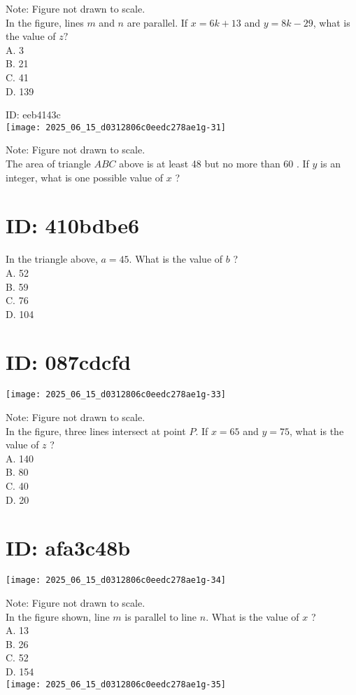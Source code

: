 Note: Figure not drawn to scale.\\
In the figure, lines $m$ and $n$ are parallel. If $x=6 k+13$ and $y=8 k-29$, what is the value of $z ?$\\
A. 3\\
B. 21\\
C. 41\\
D. 139

ID: eeb4143c\\
\texttt{[image: 2025\_06\_15\_d0312806c0eedc278ae1g-31]}

Note: Figure not drawn to scale.\\
The area of triangle $A B C$ above is at least 48 but no more than 60 . If $y$ is an integer, what is one possible value of $x$ ?

\section*{ID: 410bdbe6}
In the triangle above, $a=45$. What is the value of $b$ ?\\
A. 52\\
B. 59\\
C. 76\\
D. 104

\section*{ID: 087cdcfd}
\begin{center}
\texttt{[image: 2025\_06\_15\_d0312806c0eedc278ae1g-33]}
\end{center}

Note: Figure not drawn to scale.\\
In the figure, three lines intersect at point $P$. If $x=65$ and $y=75$, what is the value of $z$ ?\\
A. 140\\
B. 80\\
C. 40\\
D. 20

\section*{ID: afa3c48b}
\begin{center}
\texttt{[image: 2025\_06\_15\_d0312806c0eedc278ae1g-34]}
\end{center}

Note: Figure not drawn to scale.\\
In the figure shown, line $m$ is parallel to line $n$. What is the value of $x$ ?\\
A. 13\\
B. 26\\
C. 52\\
D. 154\\
\texttt{[image: 2025\_06\_15\_d0312806c0eedc278ae1g-35]}

